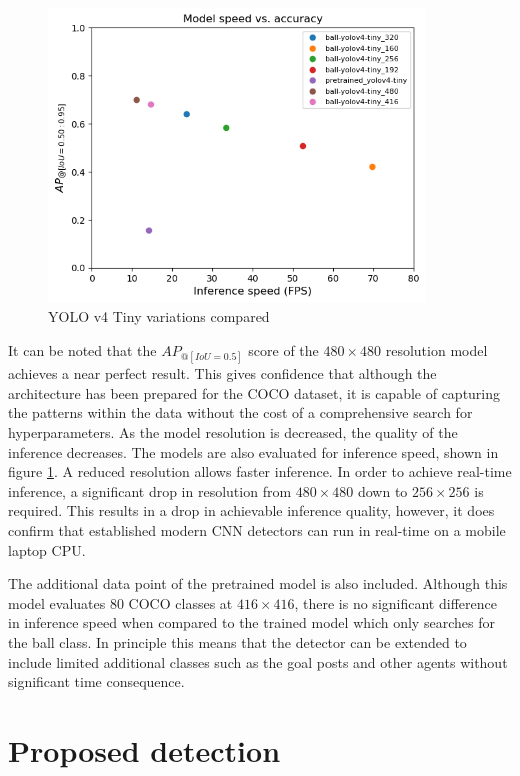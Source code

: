 \documentclass[a4paper,twoside,12pt]{report}
\begin{document}
\begin{figure}[h!]
\begin{center}
\includegraphics[width=10cm]{images/yolov4tiny_compare.png}
\caption{YOLO v4 Tiny variations compared}
\label{fig:yolov4tiny_compare}
\end{center}
\end{figure}

It can be noted that the $AP_{@[IoU=0.5]}$ score of the $480 \times 480$ resolution model achieves a near perfect result. This gives confidence that although the architecture has been prepared for the COCO dataset, it is capable of capturing the patterns within the data without the cost of a comprehensive search for hyperparameters. As the model resolution is decreased, the quality of the inference decreases. The models are also evaluated for inference speed, shown in figure \ref{fig:yolov4tiny_compare}. A reduced resolution allows faster inference. In order to achieve real-time inference, a significant drop in resolution from $480 \times 480$ down to $256 \times 256$ is required. This results in a drop in achievable inference quality, however, it does confirm that established modern CNN detectors can run in real-time on a mobile laptop CPU. 

The additional data point of the pretrained model is also included. Although this model evaluates 80 COCO classes at $416 \times 416$, there is no significant difference in inference speed when compared to the trained model which only searches for the ball class. In principle this means that the detector can be extended to include limited additional classes such as the goal posts and other agents without significant time consequence.

\section{Proposed detection}
\end{document}

